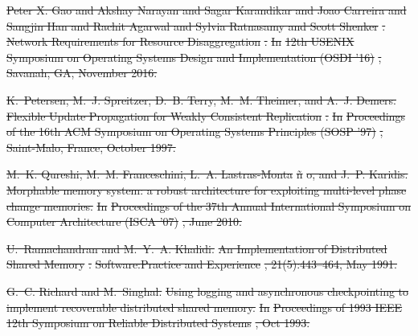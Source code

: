 \documentclass[sigconf]{acmart}
\renewcommand{\em}{\it}
\providecommand{\DIFdel}[1]{{\protect\color{red}\sout{#1}}}                      %
\begin{document}
{%
\DIFdel{Peter X. Gao and Akshay Narayan and Sagar Karandikar and Joao Carreira and
  Sangjin Han and Rachit Agarwal and Sylvia Ratnasamy and Scott Shenker}%
\DIFdel{.
}%
\DIFdel{Network Requirements for Resource Disaggregation}%
\DIFdel{.
}%
\DIFdel{In }%
\DIFdel{12th USENIX Symposium on Operating Systems Design and
  Implementation (OSDI '16)}%
\DIFdel{, Savanah, GA, November 2016.
}%

\DIFdel{K.~Petersen, M.~J. Spreitzer, D.~B. Terry, M.~M. Theimer, and A.~J. Demers.
}%
\DIFdel{Flexible Update Propagation for Weakly Consistent Replication}%
\DIFdel{.
}%
\DIFdel{In }%
\DIFdel{Proceedings of the 16th ACM Symposium on Operating Systems
  Principles (SOSP '97)}%
\DIFdel{, Saint-Malo, France, October 1997.
}%

\DIFdel{M.~K. Qureshi, M.~M. Franceschini, L.~A. Lastras-Monta}%
\DIFdel{\~n}%
\DIFdel{o, and J.~P.
  Karidis.
}%
\DIFdel{Morphable memory system: a robust architecture for exploiting
  multi-level phase change memories.
}%
\DIFdel{In }%
\DIFdel{Proceedings of the 37th Annual International Symposium on
  Computer Architecture (ISCA '07)}%
\DIFdel{, June 2010.
}%

\DIFdel{U.~Ramachandran and M.~Y.~A. Khalidi.
}%
\DIFdel{An Implementation of Distributed Shared Memory}%
\DIFdel{.
}%
\DIFdel{Software:Practice and Experience}%
\DIFdel{, 21(5):443–464, May 1991.
}%

\DIFdel{G.~C. Richard and M.~Singhal.
}%
\DIFdel{Using logging and asynchronous checkpointing to implement recoverable
  distributed shared memory.
}%
\DIFdel{In }%
\DIFdel{Proceedings of 1993 IEEE 12th Symposium on Reliable
  Distributed Systems}%
\DIFdel{, Oct 1993.
}%

}
\end{document}
